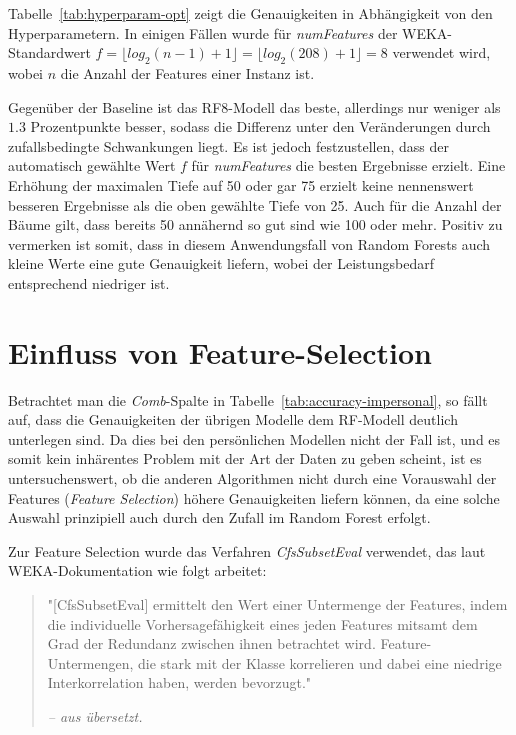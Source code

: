 Tabelle~\ref{tab:hyperparam-opt} zeigt die Genauigkeiten in Abhängigkeit von den Hyperparametern. In einigen Fällen wurde für \textit{numFeatures} der WEKA-Standardwert $f = \lfloor log_2(n - 1) + 1 \rfloor = \lfloor log_2(208) + 1 \rfloor = 8$ verwendet wird, wobei $n$ die Anzahl der Features einer Instanz ist.

Gegenüber der Baseline ist das RF8-Modell das beste, allerdings nur weniger als $1.3$ Prozentpunkte besser, sodass die Differenz unter den Veränderungen durch zufallsbedingte Schwankungen liegt. Es ist jedoch festzustellen, dass der automatisch gewählte Wert $f$ für \textit{numFeatures} die besten Ergebnisse erzielt. Eine Erhöhung der maximalen Tiefe auf 50 oder gar 75 erzielt keine nennenswert besseren Ergebnisse als die oben gewählte Tiefe von 25. Auch für die Anzahl der Bäume gilt, dass bereits 50 annähernd so gut sind wie 100 oder mehr. Positiv zu vermerken ist somit, dass in diesem Anwendungsfall von Random Forests auch kleine Werte eine gute Genauigkeit liefern, wobei der Leistungsbedarf entsprechend niedriger ist.

\section{Einfluss von Feature-Selection}
Betrachtet man die \textit{Comb}-Spalte in Tabelle~\ref{tab:accuracy-impersonal}, so fällt auf, dass die Genauigkeiten der übrigen Modelle dem RF-Modell deutlich unterlegen sind. Da dies bei den persönlichen Modellen nicht der Fall ist, und es somit kein inhärentes Problem mit der Art der Daten zu geben scheint, ist es untersuchenswert, ob die anderen Algorithmen nicht durch eine Vorauswahl der Features (\textit{Feature Selection}) höhere Genauigkeiten liefern können, da eine solche Auswahl prinzipiell auch durch den Zufall im Random Forest erfolgt.

Zur Feature Selection wurde das Verfahren \textit{CfsSubsetEval} \cite{Hall1998} verwendet, das laut WEKA-Dokumentation wie folgt arbeitet:

\begin{quote}
	"[CfsSubsetEval] ermittelt den Wert einer Untermenge der Features, indem die individuelle Vorhersagefähigkeit eines jeden Features mitsamt dem Grad der Redundanz zwischen ihnen betrachtet wird. Feature-Untermengen, die stark mit der Klasse korrelieren und dabei eine niedrige Interkorrelation haben, werden bevorzugt."
	
	\textit{-- aus \cite{WekaCfsSubsetEval} übersetzt.}
\end{quote}

